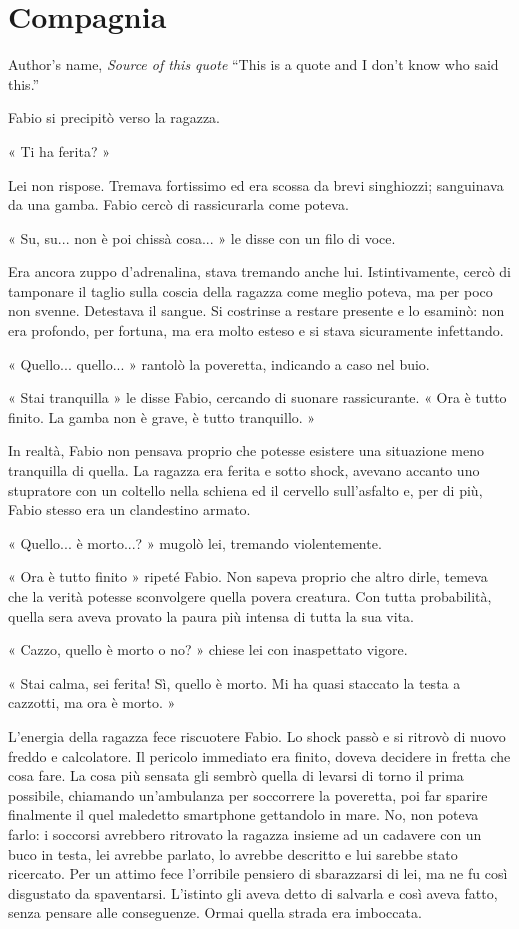 \chapter{Compagnia}

\begin{chapquote}{Author's name, \textit{Source of this quote}}
``This is a quote and I don't know who said this.''
\end{chapquote}



Fabio si precipitò verso la ragazza.

« Ti ha ferita? »

Lei non rispose. Tremava fortissimo ed era scossa da brevi singhiozzi; sanguinava da una gamba. Fabio cercò di rassicurarla come poteva.

« Su, su... non è poi chissà cosa... » le disse con un filo di voce.

Era ancora zuppo d'adrenalina, stava tremando anche lui. Istintivamente, cercò di tamponare il taglio sulla coscia della ragazza come meglio poteva, ma per poco non svenne. Detestava il sangue. Si costrinse a restare presente e lo esaminò: non era profondo, per fortuna, ma era molto esteso e si stava sicuramente infettando.

« Quello... quello... » rantolò la poveretta, indicando a caso nel buio.

« Stai tranquilla » le disse Fabio, cercando di suonare rassicurante. « Ora è tutto finito. La gamba non è grave, è tutto tranquillo. »

In realtà, Fabio non pensava proprio che potesse esistere una situazione meno tranquilla di quella. La ragazza era ferita e sotto shock, avevano accanto uno stupratore con un coltello nella schiena ed il cervello sull'asfalto e, per di più, Fabio stesso era un clandestino armato.

« Quello... è morto...? » mugolò lei, tremando violentemente.

« Ora è tutto finito » ripeté Fabio. Non sapeva proprio che altro dirle, temeva che la verità potesse sconvolgere quella povera creatura. Con tutta probabilità, quella sera aveva provato la paura più intensa di tutta la sua vita.

« Cazzo, quello è morto o no? » chiese lei con inaspettato vigore.

« Stai calma, sei ferita! Sì, quello è morto. Mi ha quasi staccato la testa a cazzotti, ma ora è morto. »

L'energia della ragazza fece riscuotere Fabio. Lo shock passò e si ritrovò di nuovo freddo e calcolatore. Il pericolo immediato era finito, doveva decidere in fretta che cosa fare. La cosa più sensata gli sembrò quella di levarsi di torno il prima possibile, chiamando un'ambulanza per soccorrere la poveretta, poi far sparire finalmente il quel maledetto smartphone gettandolo in mare. No, non poteva farlo: i soccorsi avrebbero ritrovato la ragazza insieme ad un cadavere con un buco in testa, lei avrebbe parlato, lo avrebbe descritto e lui sarebbe stato ricercato. Per un attimo fece l'orribile pensiero di sbarazzarsi di lei, ma ne fu così disgustato da spaventarsi. L'istinto gli aveva detto di salvarla e così aveva fatto, senza pensare alle conseguenze. Ormai quella strada era imboccata.

